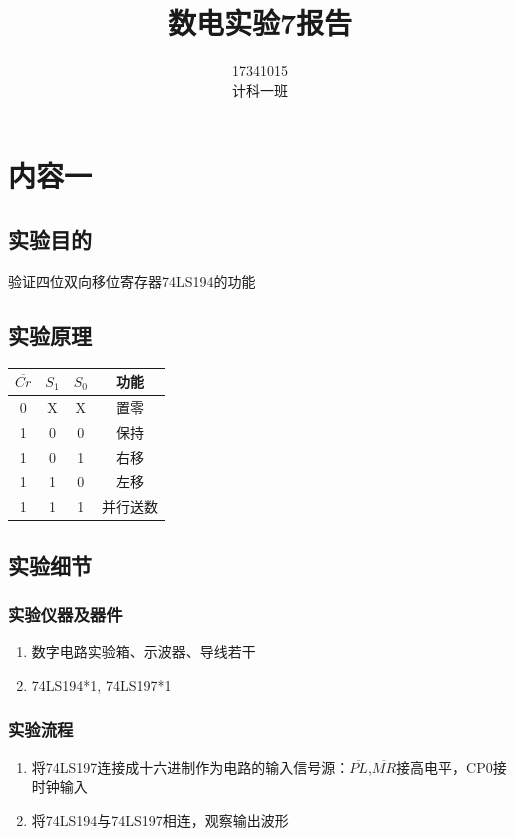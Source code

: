 \documentclass[11pt,UTF8]{ctexart}
\title{数电实验7报告}
\author{17341015\quad数据科学与计算机学院\\计科一班\quad陈鸿峥}
\date{}
\begin{document}
\maketitle
\vspace{-50pt}%
\lstset{language=C++,escapechar=`}

\section{内容一}
\subsection{实验目的}
验证四位双向移位寄存器74LS194的功能

\subsection{实验原理}
\begin{table}[H]
  \centering
    \begin{tabular}{|c|c|c|c|}
    \hline
    $\overline{Cr}$    & $S_1$    & $S_0$ & 功能 \bigstrut\\
    \hline
    0     & X & X     & 置零 \bigstrut\\
    \hline
    1     & 0 & 0     & 保持 \bigstrut\\
    \hline
    1     & 0 & 1     & 右移 \bigstrut\\
    \hline
    1     & 1 & 0     & 左移 \bigstrut\\
    \hline
    1 & 1 & 1 & 并行送数\\
    \hline
    \end{tabular}%
\end{table}%

\subsection{实验细节}
\subsubsection{实验仪器及器件}
\begin{enumerate}
    \item 数字电路实验箱、示波器、导线若干
    \item 74LS194*1, 74LS197*1
\end{enumerate}

\subsubsection{实验流程}
\begin{enumerate}
    \item 将74LS197连接成十六进制作为电路的输入信号源：$\overline{PL}$,$\overline{MR}$接高电平，CP0接时钟输入
    \item 将74LS194与74LS197相连，观察输出波形
\end{enumerate}
\end{document}
